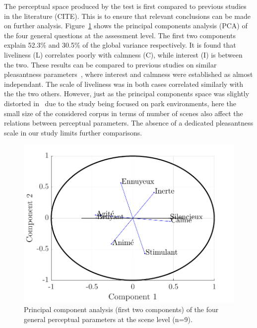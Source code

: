 \documentclass{article}
\begin{document}
\begin{sloppy}
The perceptual space produced by the test is first compared to previous studies in the literature (CITE). This is to ensure that relevant conclusions can be made on further analysis. Figure~\ref{fig:pca} shows the principal components analysis (PCA) of the four general questions at the assessment level. The first two components explain 52.3\% and 30.5\% of the global variance respectively. It is found that liveliness (L) correlates poorly with calmness (C), while interest (I) is between the two. These results can be compared to previous studies on similar pleasantness parameters~\cite{axelsson2010,jeon2018}, where interest and calmness were established as almost independant. The scale of liveliness was in both cases correlated similarly with the the two others. However, just as the principal components space was slightly distorted in~\cite{jeon2018} due to the study being focused on park environments, here the small size of the considered corpus in terms of number of scenes also affect the relations between perceptual parameters. The absence of a dedicated pleasantness scale in our study limits further comparisons.

\begin{figure}[t]
  \centering
  \centerline{\includegraphics[width=\columnwidth]{pca.pdf}}
  \caption{Principal component analysis (first two components) of the four general perceptual parameters at the scene level (n=9). }
  \label{fig:pca}
\end{figure}


\end{sloppy}
\end{document}
